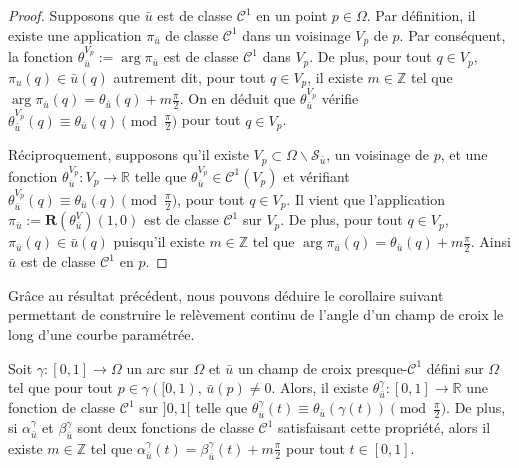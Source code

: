 \begin{proof}
    Supposons que $\bar{u}$ est de classe $\mathcal{C}^1$ en un point $p\in\Omega$. Par définition, il existe une application $\pi_{\bar{u}}$ de classe $\mathcal{C}^1$ dans un voisinage $V_p$ de $p$. Par conséquent, la fonction $\theta_{\bar{u}}^{V_p}:=\arg \pi_{\bar{u}}$ est de classe $\mathcal{C}^1$ dans $V_p$. De plus, pour tout $q\in V_p$, $\pi_u(q)\in\bar{u}(q)$ autrement dit, pour tout $q\in V_p$, il existe $m\in\mathbb{Z}$ tel que $\arg\pi_{\bar{u}}(q)=\theta_{\bar{u}}(q)+m\frac{\pi}{2}$. On en déduit que $\theta_{\bar{u}}^{V_p}$ vérifie $\theta^{V_p}_{\bar{u}}(q)\equiv\theta_{\bar{u}}(q)\pmod{\frac{\pi}{2}}$ pour tout $q\in V_p$.

    Réciproquement, supposons qu'il existe $V_p\subset \Omega \backslash \mathcal{S}_{\bar{u}}$, un voisinage de $p$, et une fonction $\theta_{\bar{u}}^{V_p}:V_p \rightarrow \mathbb{R}$ telle que $\theta_{\bar{u}}^{V_p}\in \mathcal{C}^1(V_p)$ et vérifiant $\theta_{\bar{u}}^{V_p}(q)\equiv\theta_{\bar{u}}(q) \pmod{\frac{\pi}{2}}$, pour tout $q\in V_p$. Il vient que l'application $\pi_{\bar{u}}:=\mathbf{R}(\theta_{\bar{u}}^V)(1,0)$ est de classe $\mathcal{C}^1$ sur $V_p$. De plus, pour tout $q\in V_p$, $\pi_{\bar{u}}(q)\in \bar{u}(q)$ puisqu'il existe $m\in\mathbb{Z}$ tel que $\arg\pi_{\bar{u}}(q)=\theta_{\bar{u}}(q)+m\frac{\pi}{2}$. Ainsi $\bar{u}$ est de classe $\mathcal{C}^1$ en $p$.
\end{proof}


Grâce au résultat précédent, nous pouvons déduire le corollaire suivant permettant de construire le relèvement continu de l'angle d'un champ de croix le long d'une courbe paramétrée.

\begin{corollary}
    \label{cor:relevement_continu}
    Soit $\gamma: [0, 1] \longrightarrow \Omega$ un arc sur $\Omega$ et $\bar{u}$ un champ de croix presque-$\mathcal{C}^1$ défini sur $\Omega$ tel que pour tout $p\in\gamma([0, 1)$, $\bar{u}(p)\neq 0$. Alors, il existe $\theta^\gamma_{\bar{u}}: [0, 1] \longrightarrow \mathbb{R}$  une fonction de classe $\mathcal{C}^1$ sur $]0,1[$ telle que $\theta^\gamma_{\bar{u}}(t) \equiv \theta_{\bar{u}}(\gamma(t)) \pmod{\frac{\pi}{2}}$. De plus, si $\alpha_{\bar{u}}^\gamma$ et $\beta_{\bar{u}}^\gamma$ sont deux fonctions de classe $\mathcal{C}^1$ satisfaisant cette propriété, alors il existe $m \in \mathbb{Z}$ tel que $\alpha_{\bar{u}}^\gamma(t) = \beta_{\bar{u}}^\gamma(t) + m\frac{\pi}{2}$ pour tout $t \in [0, 1]$.
\end{corollary}

